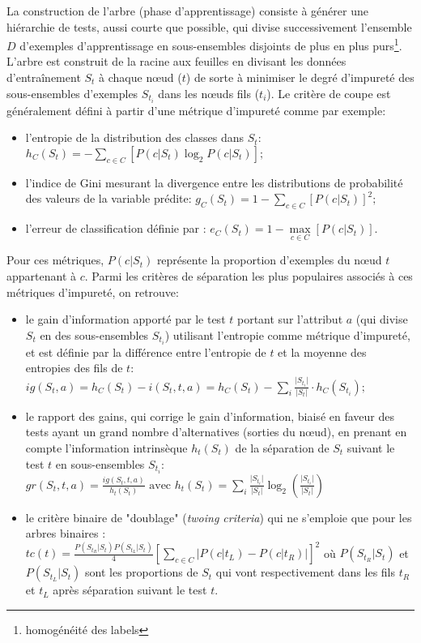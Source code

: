 La construction de l'arbre (phase d'apprentissage) consiste à générer une hiérarchie de tests, aussi courte que possible, qui divise successivement l'ensemble $D$ d'exemples d'apprentissage en sous-ensembles disjoints de plus en plus purs\footnote{homogénéité des labels}. %
L'arbre est construit de la racine aux feuilles en divisant les données d'entraînement $S_{t}$ à chaque nœud ($t$) de sorte à minimiser le degré d'impureté des sous-ensembles d'exemples $S_{t_i}$ dans les n\oe{}uds fils ($t_i$). Le critère de coupe est généralement défini à partir d'une métrique d'impureté comme par exemple:
\begin{itemize}
	\item l'entropie de la distribution des classes dans $S_t$: \\ $h_C(S_t) = - \sum\limits_{c \in C} \left[P(c \vert S_t) \log_2 P(c \vert S_t)\right];$
	\item l'indice de Gini mesurant la divergence entre les distributions de probabilité des valeurs de la variable prédite: $g_C(S_t) = 1 - \sum\limits_{c \in C} \left[P(c \vert S_t)\right]^2;$
	\item l'erreur de classification définie par : $e_C(S_t) = 1 - \max\limits_{c \in C} \left[P(c \vert S_t)\right]$. 
\end{itemize}
Pour ces métriques, $P(c \vert S_t)$ représente la proportion d'exemples du n\oe{}ud $t$ appartenant à $c$. Parmi les critères de séparation les plus populaires associés à ces métriques d'impureté, on retrouve: 

\begin{itemize}
	\item le gain d'information apporté par le test $t$ portant sur l'attribut $a$ (qui divise $S_t$ en des sous-ensembles $S_{t_i}$) utilisant l'entropie comme métrique d'impureté, et est définie par la différence entre l'entropie de $t$ et la moyenne des entropies des fils de $t$: \\ $ig(S_t, a) = h_C(S_t) - i(S_t, t, a) = h_C(S_t) - \sum\limits_{i} \frac{\vert S_{t_i} \vert}{\vert S_{t} \vert} \cdot h_C(S_{t_i});$
	\item le rapport des gains, qui corrige le gain d'information, biaisé en faveur des tests ayant un grand nombre d'alternatives (sorties du nœud), en prenant en compte l'information intrinsèque $h_t(S_t)$ de la séparation de $S_t$ suivant le test $t$ en sous-ensembles $S_{t_i}$: \\$gr(S_t, t, a) = \frac{ig(S_t, t, a)}{h_t(S_t)} \text{ avec } h_t(S_t) = \sum\limits_i \frac{\vert S_{t_i}\vert}{\vert S_t \vert} \log_2 \left(\frac{\vert S_{t_i}\vert}{\vert S_t \vert}\right)$
	\item le critère binaire de "doublage" (\textit{twoing criteria}) qui ne s'emploie que pour les arbres binaires : \\ $tc(t) = \frac{P(S_{t_R} \vert S_t)P(S_{t_L} \vert S_t)}{4} \left[\sum\limits_{c \in C} \vert P(c \vert t_L) - P(c \vert t_R)\vert\right]^2$ où $P(S_{t_R} \vert S_t)$ et $P(S_{t_L} \vert S_t)$ sont les proportions de $S_t$ qui vont respectivement dans les fils $t_R$ et $t_L$ après séparation suivant le test $t$.
\end{itemize}

